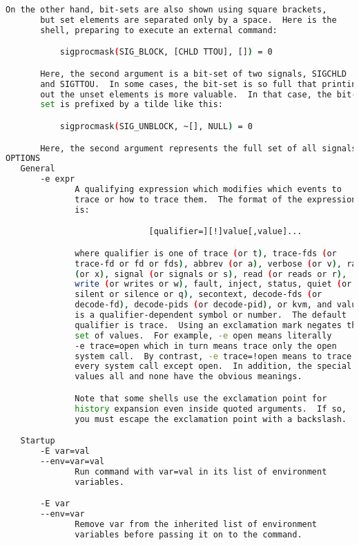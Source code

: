 {{\begin{lstlisting}[language=bash]
       On the other hand, bit-sets are also shown using square brackets,
       but set elements are separated only by a space.  Here is the
       shell, preparing to execute an external command:

           sigprocmask(SIG_BLOCK, [CHLD TTOU], []) = 0

       Here, the second argument is a bit-set of two signals, SIGCHLD
       and SIGTTOU.  In some cases, the bit-set is so full that printing
       out the unset elements is more valuable.  In that case, the bit-
       set is prefixed by a tilde like this:

           sigprocmask(SIG_UNBLOCK, ~[], NULL) = 0

       Here, the second argument represents the full set of all signals.
OPTIONS
   General
       -e expr
              A qualifying expression which modifies which events to
              trace or how to trace them.  The format of the expression
              is:

                             [qualifier=][!]value[,value]...

              where qualifier is one of trace (or t), trace-fds (or
              trace-fd or fd or fds), abbrev (or a), verbose (or v), raw
              (or x), signal (or signals or s), read (or reads or r),
              write (or writes or w), fault, inject, status, quiet (or
              silent or silence or q), secontext, decode-fds (or
              decode-fd), decode-pids (or decode-pid), or kvm, and value
              is a qualifier-dependent symbol or number.  The default
              qualifier is trace.  Using an exclamation mark negates the
              set of values.  For example, -e open means literally
              -e trace=open which in turn means trace only the open
              system call.  By contrast, -e trace=!open means to trace
              every system call except open.  In addition, the special
              values all and none have the obvious meanings.

              Note that some shells use the exclamation point for
              history expansion even inside quoted arguments.  If so,
              you must escape the exclamation point with a backslash.

   Startup
       -E var=val
       --env=var=val
              Run command with var=val in its list of environment
              variables.

       -E var
       --env=var
              Remove var from the inherited list of environment
              variables before passing it on to the command.


\end{lstlisting}}}
